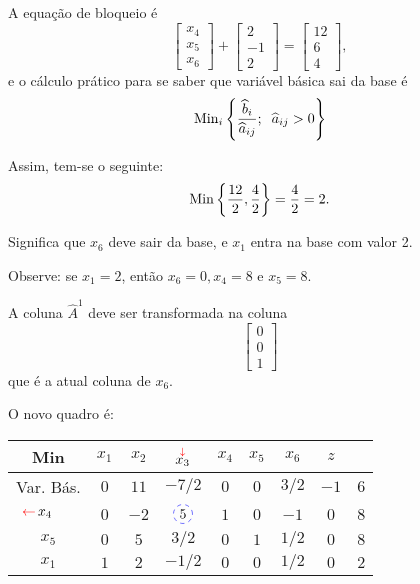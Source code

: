 A equação de bloqueio é 
\[
  \begin{bmatrix}
    x_4 \\
    x_5 \\
    x_6
  \end{bmatrix}  
  +
  \begin{bmatrix}
    2 \\
    -1\\
    2
  \end{bmatrix}
  = 
  \begin{bmatrix}
    12 \\
    6 \\
    4
  \end{bmatrix},
\]
 e o cálculo prático para se saber que variável  básica sai da base é 
 \[
   \operatorname{Min}_{i} \left\{ \frac{\widehat{b}_i}{\widehat{a}_{ij}}; \;\; \widehat{a}_{ij} > 0 \right\}
 \]

 Assim, tem-se o seguinte:
 \[
   \operatorname{Min}\left\{\frac{12}{2}, \frac{4}{2}\right\}  = \frac{4}{2} = 2.
 \]

 Significa que $ x_6 $ deve sair da base, e $ x_1 $ entra na base com valor 2.
 
 Observe: se $ x_1 = 2 $, então $ x_6 = 0, x_4 = 8 \text{ e } x_5 = 8 $.

 A coluna $ \widehat{A}^{1} $ deve ser transformada na coluna 
 \[
   \begin{bmatrix} 
    0 \\ 
    0 \\ 
    1 
   \end{bmatrix} 
\] 
que é a atual coluna de $ x_6 $.

O novo quadro é:

\begin{table}[!htbp]
  \centering
  \begin{tabular}{c|ccccccc|c}
    Min           & $x_1$ & $x_2$ & $\stackrel{\textcolor{red}{\downarrow}}{x_{3}}$ & $x_4$ & $x_5$ & $x_6$ & $z$  &     \\ \hline
    Var. Bás.     & $0$   & $11$  & $-7/2$          & $0$   & $0$   & $3/2$ & $-1$ & $6$ \\ \hline
    $\setaSai{4}$ & $0$   & $-2$  & $\circulo{5}$   & $1$   & $0$   & $-1$  & $0$  & $8$ \\
    $x_5$         & $0$   & $5$   & $3/2$           & $0$   & $1$   & $1/2$ & $0$  & $8$ \\
    $x_1$         & $1$   & $2$   & $-1/2$          & $0$   & $0$   & $1/2$ & $0$  & $2$ 
  \end{tabular}
\end{table}

